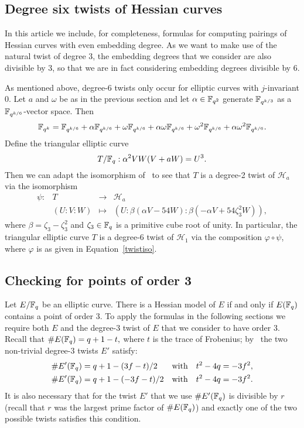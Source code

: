 \subsection{Degree six twists of Hessian curves}\label{sextic}

In this article we include, for completeness, formulas for computing pairings
of Hessian curves with even embedding degree. 
As we want to make use of the natural twist of degree 3, 
the embedding degrees that we consider are also divisible by 3, 
so that we are in fact considering embedding degrees divisible by 6.

As mentioned above, degree-6 twists only occur for elliptic curves
with $j$-invariant 0. 
Let $a$ and $\omega$ be as in the previous section
and let $\alpha \in \mathbb{F}_{q^2}$ generate $\mathbb{F}_{q^{k/3}}$ as a 
$\mathbb{F}_{q^{k/6}}$-vector space. Then
\[\mathbb{F}_{q^k} = \mathbb{F}_{q^{k/6}} + \alpha\mathbb{F}_{q^{k/6}} 
+\omega\mathbb{F}_{q^{k/6}} + \alpha\omega\mathbb{F}_{q^{k/6}}
+\omega^2\mathbb{F}_{q^{k/6}} + \alpha\omega^2\mathbb{F}_{q^{k/6}}.\] 
Define the triangular elliptic curve
\[T/\mathbb{F}_{q} : \alpha^2 VW(V + aW) = U^3.\]
Then we can adapt the isomorphism of~\cite[Theorem 5.3]{2015/hessian}
to see that $T$ is a degree-2 twist of $\mathcal{H}_a$ via
the isomorphism
\begin{equation}\label{quadtwist}
\begin{array}{rccc}
\psi: & T & \rightarrow & \mathcal{H}_a \\ 
& (U:V:W) & \mapsto &
(U:\beta(\alpha V - 54W) : \beta(-\alpha V + 54\zeta_3^2 W)),
\end{array}
\end{equation}
where $\beta = \zeta_3-\zeta_3^2$ and 
$\zeta_3 \in \mathbb{F}_{q}$ is a primitive cube root of unity.
In particular, the triangular elliptic curve $T$ is a degree-6 twist of $\mathcal{H}_1$ via the composition $\varphi \circ \psi$,
where $\varphi$ is as given in Equation~\ref{twistiso}.

\subsection{Checking for points of order 3}\label{twist}

Let $E/\mathbb{F}_{q}$ be an elliptic curve. There is a Hessian model of $E$ if and only if $E(\mathbb{F}_{q})$ contains a point of order 3. 
To apply the formulas in the following sections we require both $E$ and the 
degree-3 twist of $E$ that we consider to have order 3.
Recall that
$\#E(\mathbb{F}_{q}) = q+1-t,$
where $t$ is the trace of Frobenius; 
by~\cite{2006/hess} the two non-trivial degree-3 twists $E'$ satisfy:
\begin{align*}
\# E' (\mathbb{F}_{q}) &= q + 1 - (3f - t) / 2 & \text{with} & \quad t^2 - 4q = -3f^2, \\
\# E' (\mathbb{F}_{q}) &= q + 1 - (-3f- t) / 2 & \text{with} & \quad t^2 - 4q = -3f^2.
\end{align*}
It is also necessary that for the twist $E'$ that we use $\#E'(\mathbb{F}_{q})$ is divisible by $r$ (recall that $r$ was the largest prime factor of $\# E(\mathbb{F}_{q})$) and exactly one of the two possible twists satisfies this condition.

